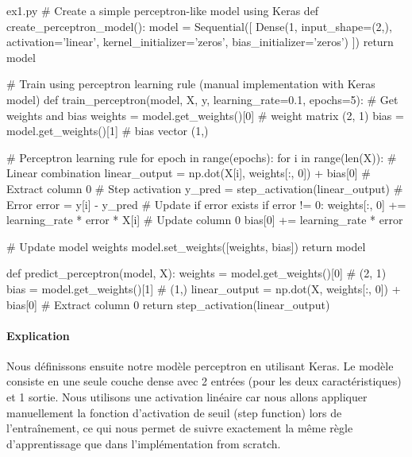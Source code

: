 \documentclass[12pt,a4paper]{article}
\begin{document}
\begin{codeholder}{ex1.py}
# Create a simple perceptron-like model using Keras
def create_perceptron_model():
    model = Sequential([
        Dense(1, input_shape=(2,), activation='linear', 
              kernel_initializer='zeros', bias_initializer='zeros')
    ])
    return model

# Train using perceptron learning rule (manual implementation with Keras model)
def train_perceptron(model, X, y, learning_rate=0.1, epochs=5):
    # Get weights and bias
    weights = model.get_weights()[0]  # weight matrix (2, 1)
    bias = model.get_weights()[1]     # bias vector (1,)
    
    # Perceptron learning rule
    for epoch in range(epochs):
        for i in range(len(X)):
            # Linear combination
            linear_output = np.dot(X[i], weights[:, 0]) + bias[0]  # Extract column 0
            # Step activation
            y_pred = step_activation(linear_output)
            # Error
            error = y[i] - y_pred
            # Update if error exists
            if error != 0:
                weights[:, 0] += learning_rate * error * X[i]  # Update column 0
                bias[0] += learning_rate * error
    
    # Update model weights
    model.set_weights([weights, bias])
    return model

def predict_perceptron(model, X):
    weights = model.get_weights()[0]  # (2, 1)
    bias = model.get_weights()[1]     # (1,)
    linear_output = np.dot(X, weights[:, 0]) + bias[0]  # Extract column 0
    return step_activation(linear_output)
\end{codeholder}

\paragraph{Explication}
Nous définissons ensuite notre modèle perceptron en utilisant Keras. Le modèle consiste en une seule couche dense avec 2 entrées (pour les deux caractéristiques) et 1 sortie.
Nous utilisons une activation linéaire car nous allons appliquer manuellement la fonction d'activation de seuil (step function) lors de l'entraînement,
ce qui nous permet de suivre exactement la même règle d'apprentissage que dans l'implémentation from scratch.

\end{document}
